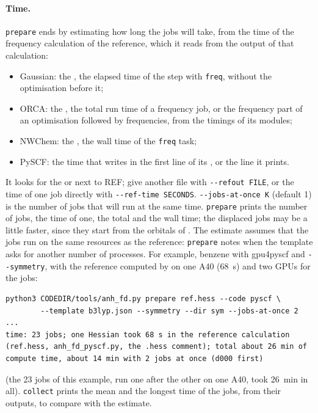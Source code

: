 \paragraph{Time.} \devonly{} \texttt{prepare} ends by estimating how
long the jobs will take, from the time of the frequency calculation of
the reference, which it reads from the output of that calculation:
\begin{itemize}
\item Gaussian: the , the elapsed time of the step with
  \texttt{freq}, without the optimisation before it;
\item ORCA: the , the total run time of a frequency job, or
  the frequency part of an optimisation followed by frequencies, from the
  timings of its modules;
\item NWChem: the , the wall time of the \texttt{freq} task;
\item PySCF: the time that  writes in
  the first line of its , or the line it prints.
\end{itemize}
It looks for the  or  next to REF; give another
file with \texttt{-{}-refout FILE}, or the time of one job directly with
\texttt{-{}-ref-time SECONDS}. \texttt{-{}-jobs-at-once K} (default 1) is
the number of jobs that will run at the same time. \texttt{prepare} prints
the number of jobs, the time of one, the total and the wall time; the
displaced jobs may be a little faster, since they start from the
orbitals of . The estimate assumes that the jobs run on the
same resources as the reference: \texttt{prepare} notes when the
template asks for another number of processes. For example, benzene with
gpu4pyscf and \texttt{-{}-symmetry}, with the reference computed by
 on one A40 (68~s) and two GPUs for the
jobs:
\begin{lstlisting}
python3 CODEDIR/tools/anh_fd.py prepare ref.hess --code pyscf \
        --template b3lyp.json --symmetry --dir sym --jobs-at-once 2
...
time: 23 jobs; one Hessian took 68 s in the reference calculation
(ref.hess, anh_fd_pyscf.py, the .hess comment); total about 26 min of
compute time, about 14 min with 2 jobs at once (d000 first)
\end{lstlisting}
(the 23 jobs of this example, run one after the other on one A40, took
26~min in all). \texttt{collect} prints the mean and the longest time of
the jobs, from their outputs, to compare with the estimate.

